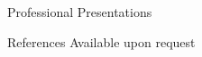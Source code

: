 \documentclass{resume} %
\begin{document}
\begin{rSection}{Professional Presentations}

\begin{refsection}
\nocite{*}
\leavevmode\printbibliography[omitnumbers=true,heading=none]
\end{refsection}

\end{rSection}

\begin{rSection}{References}
Available upon request
\end{rSection}
\end{document}

